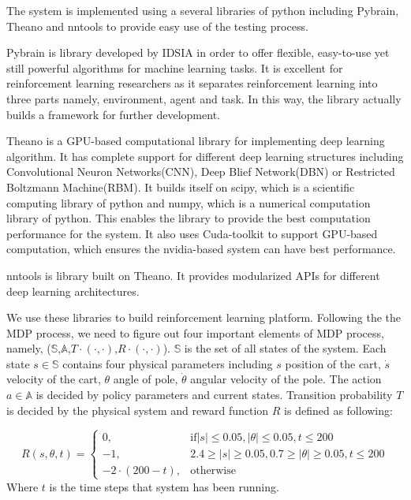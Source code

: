 \documentclass[officiallayout]{tktla}
\begin{document}
The system is implemented using a several libraries of python including Pybrain, Theano and nntools to provide easy use of the testing process. 

Pybrain is library developed by IDSIA \cite{pybrain2010jmlr} in order to offer flexible, easy-to-use yet still powerful algorithms for machine learning tasks. It is excellent for reinforcement learning researchers as it separates reinforcement learning into three parts namely, environment, agent and task. In this way, the library actually builds a framework for further development.

Theano is a GPU-based computational library for implementing deep learning algorithm. It has complete support for different deep learning structures including Convolutional Neuron Networks(CNN), Deep Blief Network(DBN) or Restricted Boltzmann Machine(RBM). It builds itself on scipy, which is a scientific computing library of python and numpy, which is a numerical computation library of python. This enables the library to provide the best computation performance for the system. It also uses Cuda-toolkit to support GPU-based computation, which ensures the nvidia-based system can have best performance.

nntools is library built on Theano. It provides modularized APIs for different deep learning architectures.

We use these libraries to build reinforcement learning platform. Following the the MDP process, we need to figure out four important elements of MDP process, namely, ($\mathbb{S}$,$\mathbb{A}$,$T\cdot(\cdot,\cdot)$,$R\cdot(\cdot,\cdot)$). $\mathbb{S}$ is the set of all states of the system. Each state $s \in \mathbb{S}$ contains four physical parameters including $s$ position of the cart, $\dot{s}$ velocity of the cart, $\theta$ angle of pole, $\dot{\theta}$ angular velocity of the pole. The action $a \in \mathbb{A}$ is decided by policy parameters and current states. Transition probability $T$ is decided by the physical system and reward function $R$ is defined as following:

\begin{equation}
    R(s,\theta, t)= 
\begin{cases}
    0,				& \text{if} |s|\leq 0.05, |\theta| \leq 0.05, t \leq 200\\
    -1,              & 2.4 \geq |s|\geq 0.05, 0.7 \geq |\theta| \geq 0.05, t \leq 200\\
    -2 \cdot (200 - t), 		& \text{otherwise}
\end{cases}
\end{equation}
Where $t$ is the time steps that system has been running.
\end{document}
